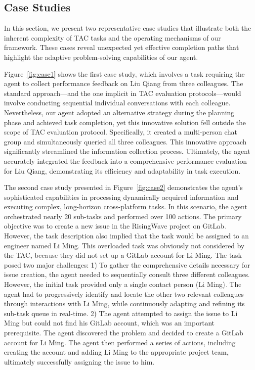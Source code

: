 \subsection{Case Studies}
\label{app:case study}
In this section, we present two representative case studies that illustrate both the inherent complexity of TAC tasks and the operating mechanisms of our framework. These cases reveal unexpected yet effective completion paths that highlight the adaptive problem-solving capabilities of our agent.


Figure~\ref{fig:case1} shows the first case study, which involves a task requiring the agent to collect performance feedback on Liu Qiang from three colleagues. 
The standard approach—and the one implicit in TAC evaluation protocols—would involve conducting sequential individual conversations with each colleague. Nevertheless, our agent adopted an alternative strategy during the planning phase and achieved task completion, yet this innovative solution fell outside the scope of TAC evaluation protocol. Specifically, it created a multi-person chat group and simultaneously queried all three colleagues. This innovative approach significantly streamlined the information collection process. Ultimately, the agent accurately integrated the feedback into a comprehensive performance evaluation for Liu Qiang, demonstrating its efficiency and adaptability in task execution.

The second case study presented in Figure~\ref{fig:case2} demonstrates the agent's sophisticated capabilities in processing dynamically acquired information and executing complex, long-horizon cross-platform tasks. In this scenario, the agent orchestrated nearly 20 sub-tasks and performed over 100 actions. The primary objective was to create a new issue in the RisingWave project on GitLab. However, the task description also implied that the task would be assigned to an engineer named Li Ming. This overloaded task was obviously not considered by the TAC, because they did not set up a GitLab account for Li Ming. The task posed two major challenges:
1) To gather the comprehensive details necessary for issue creation, the agent needed to sequentially consult three different colleagues. However, the initial task provided only a single contact person (Li Ming). The agent had to progressively identify and locate the other two relevant colleagues through interactions with Li Ming, while continuously adapting and refining its sub-task queue in real-time.
2) The agent attempted to assign the issue to Li Ming but could not find his GitLab account, which was an important prerequisite. The agent discovered the problem and decided to create a GitLab account for Li Ming. The agent then performed a series of actions, including creating the account and adding Li Ming to the appropriate project team, ultimately successfully assigning the issue to him.


